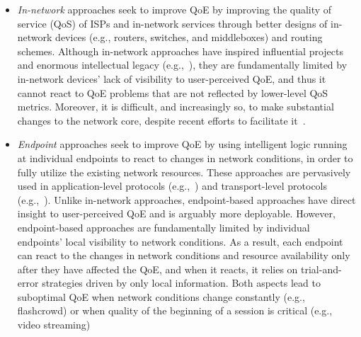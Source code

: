 \begin{itemize}
\item {\em In-network} approaches seek to improve QoE by improving
the quality of service (QoS) of ISPs and in-network services through better designs 
of in-network devices (e.g., routers, switches, and middleboxes) and routing schemes.
Although  in-network approaches have inspired influential projects and 
enormous intellectual legacy (e.g.,~\cite{demers1989analysis,csfq,active-network,red,ecn,ccn}),
they are fundamentally limited by in-network devices' lack of visibility to user-perceived QoE,
and thus it cannot react to QoE problems that are not reflected by lower-level QoS metrics.
Moreover, it is difficult, and increasingly so, to make substantial changes 
to the network core, despite recent efforts to facilitate it~\cite{feamster2014road}.

\item {\em Endpoint} approaches seek to improve QoE by using
intelligent logic running at individual endpoints to react to changes in
network conditions, in order to fully utilize the existing network resources.
These approaches are pervasively used in application-level protocols 
(e.g.,~\cite{dash,festive,butkiewicz2015klotski,diversifi,sprout})
and transport-level protocols (e.g.,~\cite{jacobson1988congestion,cubic,remy,pcc}).
Unlike in-network approaches, endpoint-based approaches have direct insight to 
user-perceived QoE and is arguably more deployable.
However, endpoint-based approaches are fundamentally limited by 
individual endpoints' local visibility to network conditions.
As a result, each endpoint can react to the changes in network conditions and 
resource availability only after they have affected the QoE,
and when it reacts, it relies on trial-and-error strategies driven by only local information.
Both aspects lead to suboptimal QoE when network conditions change constantly 
(e.g., flashcrowd) or when quality of the beginning of a session is critical (e.g., video streaming)


\end{itemize}
